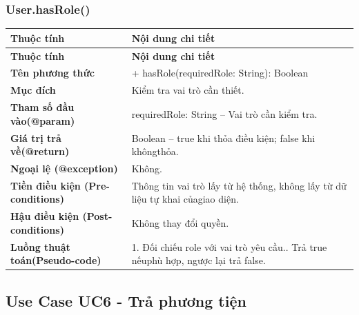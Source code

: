 \subsubsection{User.hasRole()}
\begin{longtable}{|L{0.24\textwidth}|L{0.70\textwidth}|}
\hline
\textbf{Thuộc tính} & \textbf{Nội dung chi tiết} \\
\hline
\endfirsthead
\hline
\textbf{Thuộc tính} & \textbf{Nội dung chi tiết} \\
\hline
\endhead
\textbf{Tên phương thức} & + hasRole(requiredRole: String): Boolean \\
\hline
\textbf{Mục đích} & Kiểm tra vai trò cần thiết. \\
\hline
\textbf{Tham số đầu vào}\newline \textbf{(@param)} & requiredRole: String – Vai trò cần kiểm tra. \\
\hline
\textbf{Giá trị trả về(@return)} & Boolean – true khi thỏa điều kiện; false khi khôngthỏa. \\
\hline
\textbf{Ngoại lệ (@exception)} & Không. \\
\hline
\textbf{Tiền điều kiện (Pre-}\newline \textbf{conditions)} & Thông tin vai trò lấy từ hệ thống, không lấy từ dữ liệu tự khai của\newline giao diện. \\
\hline
\textbf{Hậu điều kiện (Post-}\newline \textbf{conditions)} & Không thay đổi quyền. \\
\hline
\textbf{Luồng thuật toán}\newline \textbf{(Pseudo-code)} & 1. Đối chiếu role với vai trò yêu cầu.. Trả true nếuphù hợp, ngược lại trả false. \\
\hline
\end{longtable}
\vspace{-0.5\baselineskip}
\subsection{Use Case UC6 - Trả phương tiện}
